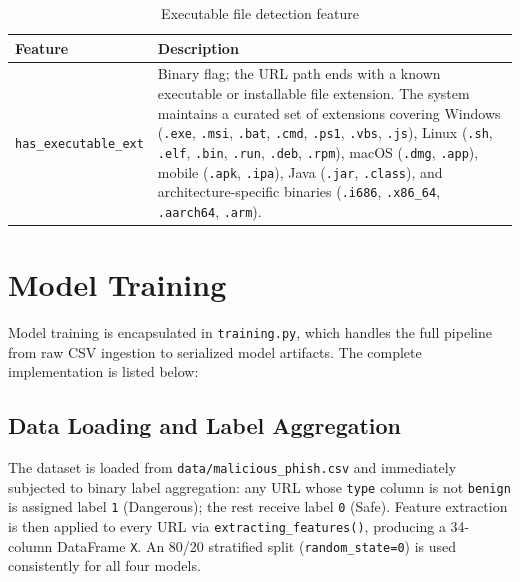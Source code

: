 \documentclass[12pt,a4paper]{article}
\begin{document}
\begin{table}[H]
    \centering
    \begin{tabularx}{\textwidth}{l >{\raggedright\arraybackslash}X}
        \toprule
        \textbf{Feature} & \textbf{Description} \\
        \midrule
        \texttt{has\_executable\_ext} & Binary flag; the URL path ends with a known executable or installable file extension. The system maintains a curated set of extensions covering Windows (\texttt{.exe}, \texttt{.msi}, \texttt{.bat}, \texttt{.cmd}, \texttt{.ps1}, \texttt{.vbs}, \texttt{.js}), Linux (\texttt{.sh}, \texttt{.elf}, \texttt{.bin}, \texttt{.run}, \texttt{.deb}, \texttt{.rpm}), macOS (\texttt{.dmg}, \texttt{.app}), mobile (\texttt{.apk}, \texttt{.ipa}), Java (\texttt{.jar}, \texttt{.class}), and architecture-specific binaries (\texttt{.i686}, \texttt{.x86\_64}, \texttt{.aarch64}, \texttt{.arm}). \\
        \bottomrule
    \end{tabularx}
    \caption{Executable file detection feature}
    \label{tab:feat_executable}
\end{table}

\section{Model Training}
\label{sec:training}

Model training is encapsulated in \texttt{training.py}, which handles the full pipeline from raw CSV ingestion to serialized model artifacts. The complete implementation is listed below:



\subsection{Data Loading and Label Aggregation}

The dataset is loaded from \texttt{data/malicious\_phish.csv} and immediately subjected to binary label aggregation: any URL whose \texttt{type} column is not \texttt{benign} is assigned label \texttt{1} (Dangerous); the rest receive label \texttt{0} (Safe). Feature extraction is then applied to every URL via \texttt{extracting\_features()}, producing a 34-column DataFrame \texttt{X}. An 80/20 stratified split (\texttt{random\_state=0}) is used consistently for all four models.
\end{document}
